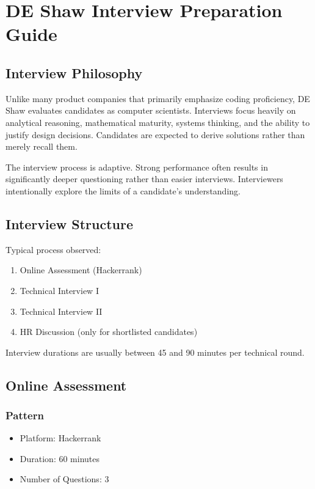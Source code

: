\documentclass[11pt,a4paper]{article}
\begin{document}
\section{DE Shaw Interview Preparation Guide}

\subsection{Interview Philosophy}

Unlike many product companies that primarily emphasize coding proficiency, DE Shaw evaluates candidates as computer scientists. Interviews focus heavily on analytical reasoning, mathematical maturity, systems thinking, and the ability to justify design decisions. Candidates are expected to derive solutions rather than merely recall them.

The interview process is adaptive. Strong performance often results in significantly deeper questioning rather than easier interviews. Interviewers intentionally explore the limits of a candidate's understanding.

\subsection{Interview Structure}

Typical process observed:

\begin{enumerate}
	\item Online Assessment (Hackerrank)
	\item Technical Interview I
	\item Technical Interview II
	\item HR Discussion (only for shortlisted candidates)
\end{enumerate}

Interview durations are usually between 45 and 90 minutes per technical round.


\subsection{Online Assessment}

\subsubsection{Pattern}

\begin{itemize}
	\item Platform: Hackerrank
	\item Duration: 60 minutes
	\item Number of Questions: 3
\end{itemize}
\end{document}
